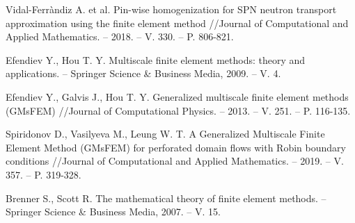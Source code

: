 \documentclass[10pt]{article}
\begin{document}
\begin{thebibliography}{8}
Vidal-Ferràndiz A. et al. Pin-wise homogenization for SPN neutron transport approximation using the finite element method //Journal of Computational and Applied Mathematics. – 2018. – V. 330. – P. 806-821.

Efendiev Y., Hou T. Y. Multiscale finite element methods: theory and applications. – Springer Science \& Business Media, 2009. – V. 4.

Efendiev Y., Galvis J., Hou T. Y. Generalized multiscale finite element methods (GMsFEM) //Journal of Computational Physics. – 2013. – V. 251. – P. 116-135.

Spiridonov D., Vasilyeva M., Leung W. T. A Generalized Multiscale Finite Element Method (GMsFEM) for perforated domain flows with Robin boundary conditions //Journal of Computational and Applied Mathematics. – 2019. – V. 357. – P. 319-328.

Brenner S., Scott R. The mathematical theory of finite element methods. – Springer Science \& Business Media, 2007. – V. 15.

\end{thebibliography}
\end{document}

